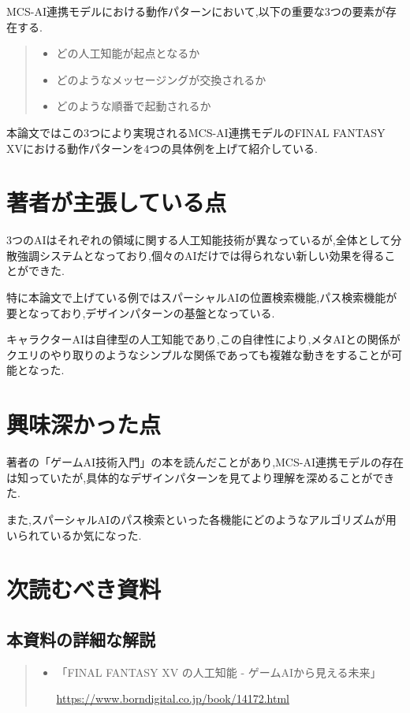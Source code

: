 \documentclass{jarticle}     %
\begin{document}
MCS-AI連携モデルにおける動作パターンにおいて,以下の重要な3つの要素が存在する.

\begin{quote}
  \begin{itemize}
   \item どの人工知能が起点となるか
   \item どのようなメッセージングが交換されるか
   \item どのような順番で起動されるか
  \end{itemize}
 \end{quote}

 本論文ではこの3つにより実現されるMCS-AI連携モデルのFINAL FANTASY XVにおける動作パターンを4つの具体例を上げて紹介している.

 \section*{著者が主張している点}
 3つのAIはそれぞれの領域に関する人工知能技術が異なっているが,全体として分散強調システムとなっており,個々のAIだけでは得られない新しい効果を得ることができた.\par
 特に本論文で上げている例ではスパーシャルAIの位置検索機能,パス検索機能が要となっており,デザインパターンの基盤となっている.\par
 キャラクターAIは自律型の人工知能であり,この自律性により,メタAIとの関係がクエリのやり取りのようなシンプルな関係であっても複雑な動きをすることが可能となった.\par

 \section*{興味深かった点}
 著者の「ゲームAI技術入門」の本を読んだことがあり,MCS-AI連携モデルの存在は知っていたが,具体的なデザインパターンを見てより理解を深めることができた.\par
 また,スパーシャルAIのパス検索といった各機能にどのようなアルゴリズムが用いられているか気になった.


 \section*{次読むべき資料}

 \subsection*{本資料の詳細な解説}

 \begin{quote}
  \begin{itemize}
   \item  「FINAL FANTASY XV の人工知能 - ゲームAIから見える未来」\par
   \url{https://www.borndigital.co.jp/book/14172.html}
  \end{itemize}
 \end{quote}
\end{document}

